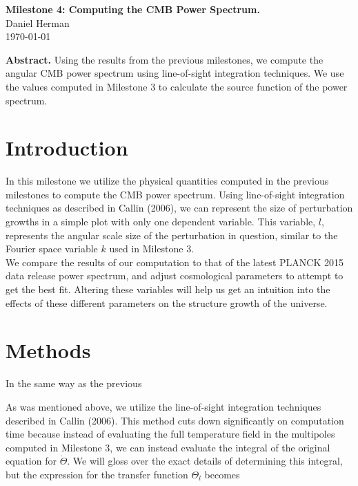 \documentclass[a4paper]{article}
\begin{document}
\begin{center}
  {\Large \bf Milestone 4: Computing the CMB Power Spectrum. }\\[4ex]
  {\large Daniel Herman}\\[4ex]
  \normalsize
  \today
  \vspace*{8ex}
      
  \begin{minipage}[t]{12cm}
      
  {\bf Abstract.} Using the results from the previous milestones, we compute the angular CMB power spectrum using line-of-sight integration techniques. We use the values computed in Milestone 3 to calculate the source function of the power spectrum.
  
  \vspace*{8ex}
  \end{minipage}

\end{center}

\section{Introduction}\label{sec:intro}

In this milestone we utilize the physical quantities computed in the previous milestones to compute the CMB power spectrum. Using line-of-sight integration techniques as described in Callin (2006), we can represent the size of perturbation growths in a simple plot with only one dependent variable. This variable, $l$, represents the angular scale size of the perturbation in question, similar to the Fourier space variable $k$ used in Milestone 3.\\

We compare the results of our computation to that of the latest PLANCK 2015 data release power spectrum, and adjust cosmological parameters to attempt to get the best fit. Altering these variables will help us get an intuition into the effects of these different parameters on the structure growth of the universe.

\section{Methods}\label{sec:meth}

In the same way as the previous 

As was mentioned above, we utilize the line-of-sight integration techniques described in Callin (2006). This method cuts down significantly on computation time because instead of evaluating the full temperature field in the multipoles computed in Milestone 3, we can instead evaluate the integral of the original equation for $\dot{\Theta}$. We will gloss over the exact details of determining this integral, but the expression for the transfer function $\Theta_l$ becomes
\end{document}
